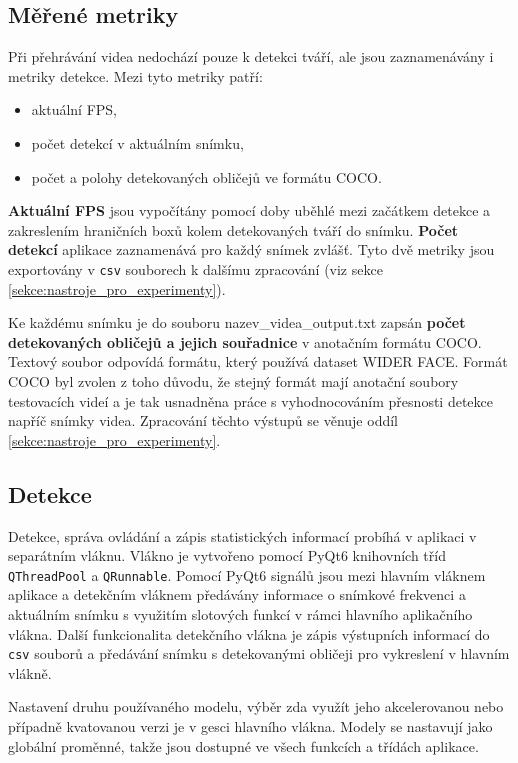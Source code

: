 \subsection*{Měřené metriky}
Při přehrávání videa nedochází pouze k detekci tváří, ale jsou zaznamenávány i metriky detekce. Mezi tyto metriky patří:

\begin{itemize}
  \item aktuální FPS,
  \item počet detekcí v aktuálním snímku,
  \item počet a polohy detekovaných obličejů ve formátu COCO.
\end{itemize}

\textbf{Aktuální FPS} jsou vypočítány pomocí doby uběhlé mezi začátkem detekce a zakreslením hraničních boxů kolem detekovaných tváří do snímku. 
\textbf{Počet detekcí} aplikace zaznamenává pro každý snímek zvlášť. Tyto dvě metriky jsou exportovány v \texttt{csv} souborech k dalšímu zpracování (viz sekce \ref{sekce:nastroje_pro_experimenty}).

Ke každému snímku je do souboru nazev\_videa\_output.txt zapsán \textbf{počet detekovaných obličejů a jejich souřadnice} v anotačním formátu COCO. Textový soubor odpovídá formátu, který používá dataset WIDER FACE. Formát COCO byl zvolen z toho důvodu, že stejný formát mají anotační soubory testovacích videí a je tak usnadněna práce s vyhodnocováním přesnosti detekce napříč snímky videa. Zpracování těchto výstupů se věnuje oddíl \ref{sekce:nastroje_pro_experimenty}.


\subsection*{Detekce}
Detekce, správa ovládání a zápis statistických informací probíhá v aplikaci v separátním vláknu. Vlákno je vytvořeno pomocí PyQt6 knihovních tříd \texttt{QThreadPool} a \texttt{QRunnable}. Pomocí PyQt6 signálů jsou mezi hlavním vláknem aplikace a detekčním vláknem předávány informace o snímkové frekvenci a aktuálním snímku s využitím slotových funkcí v rámci hlavního aplikačního vlákna. Další funkcionalita detekčního vlákna je zápis výstupních informací do \texttt{csv} souborů a předávání snímku s detekovanými obličeji pro vykreslení v hlavním vlákně.

Nastavení druhu používaného modelu, výběr zda využít jeho akcelerovanou nebo případně kvatovanou verzi je v gesci hlavního vlákna. Modely se nastavují jako globální proměnné, takže jsou dostupné ve všech funkcích a třídách aplikace.

